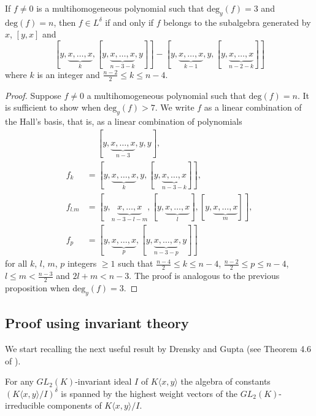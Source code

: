 \documentclass{cimart}
\begin{document}
\begin{corollary}  If $f \neq 0$ is a multihomogeneous polynomial such that $\mbox{deg}_y(f) = 3$ and $\mbox{deg}(f) = n$, then $f \in L^{\delta}$ if and only if $f $ belongs to the subalgebra generated by $x$, $[y, x]$ and 
\[
[y, \underbrace{x, \ldots, x}_k, [y, \underbrace{x, \ldots, x}_{n-3-k}, y]] - [y,\underbrace{x, \ldots, x}_{k-1}, y, [y, \underbrace{x, \ldots, x}_{n-2-k}]]
\]
where $k$ is an integer and $\frac{n-2}{2}\leq k \leq n-4$.
\end{corollary}
\begin{proof} Suppose $f \neq 0$ a multihomogeneous polynomial such that $\mbox{deg}(f) = n$. It is sufficient to show when $\mbox{deg}_y(f) > 7$. We write $f$ as a linear combination of the Hall's basis, that is, as a linear combination of polynomials 
\begin{align*}
&\quad \ [y, \underbrace{x, \ldots, x}_{n-3}, y, y],\\
f_{k} &= [y, \underbrace{x, \ldots, x}_{k}, y, [y, \underbrace{x, \ldots, x}_{n-3-k}]],\\
f_{l. m} &= [y, \underbrace{x, \ldots, x}_{n-3-l-m}, [y, \underbrace{x, \ldots, x}_{l}], [y, \underbrace{x, \ldots, x}_{m}]],\\ 
f_p &= [y, \underbrace{x, \ldots, x}_{p}, [y,  \underbrace{x, \ldots, x}_{n-3 - p}, y]]
\end{align*}
for all $k$, $l$, $m$, $p$ integers $\geq 1$ such that $\frac{n-4}{2}\leq k \leq n-4$, $\frac{n-2}{2}\leq p \leq n-4$, $l \leq m < \frac{n-3}{2}$ and $2l + m < n-3$. The proof is analogous to the previous proposition when $\mbox{deg}_y(f) = 3$.
\end{proof}

\subsection{Proof using invariant theory}
We start recalling the next useful result by Drensky and Gupta (see Theorem 4.6 of \cite{DG}).

\begin{theorem}
For any $GL_2(K)$-invariant ideal $I$ of $K\langle x,y \rangle$ the algebra of constants
$(K\langle x, y\rangle/I )^\delta$ is spanned by the highest weight vectors of the $GL_2(K)$-irreducible components
of $K\langle x, y\rangle/I$.
\end{theorem}
\end{document}
